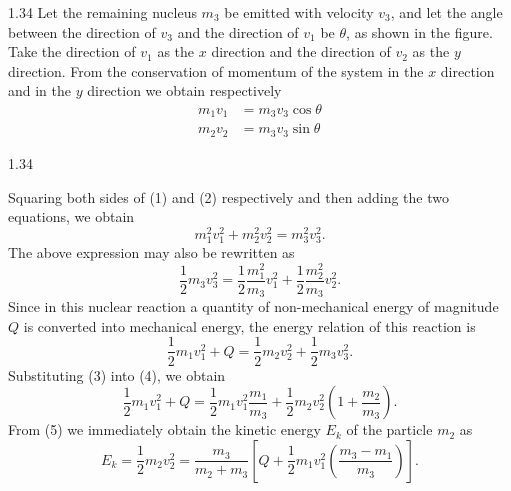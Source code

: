 \begin{solution}{1.34}
Let the remaining nucleus $m_3$ be emitted with velocity $v_3$, and let the angle between the direction of $v_3$ and the direction of $v_1$ be $\theta$, as shown in the figure. Take the direction of $v_1$ as the $x$ direction and the direction of $v_2$ as the $y$ direction. From the conservation of momentum of the system in the $x$ direction and in the $y$ direction we obtain respectively
\begin{align}
m_1v_1 &= m_3v_3\cos\theta \tag{1}\\
m_2v_2 &= m_3v_3\sin\theta \tag{2}
\end{align}

\begin{figbox}{1.34}
\end{figbox}

Squaring both sides of (1) and (2) respectively and then adding the two equations, we obtain
\[
m_1^2v_1^2+m_2^2v_2^2=m_3^2v_3^2.
\]
The above expression may also be rewritten as
\begin{equation}
\frac{1}{2}m_3v_3^2=\frac{1}{2}\frac{m_1^2}{m_3}v_1^2+\frac{1}{2}\frac{m_2^2}{m_3}v_2^2. \tag{3}
\end{equation}
Since in this nuclear reaction a quantity of non-mechanical energy of magnitude $Q$ is converted into mechanical energy, the energy relation of this reaction is
\begin{equation}
\frac{1}{2}m_1v_1^2+Q=\frac{1}{2}m_2v_2^2+\frac{1}{2}m_3v_3^2. \tag{4}
\end{equation}
Substituting (3) into (4), we obtain
\begin{equation}
\frac{1}{2}m_1v_1^2+Q=\frac{1}{2}m_1v_1^2\frac{m_1}{m_3}
+\frac{1}{2}m_2v_2^2\left(1+\frac{m_2}{m_3}\right). \tag{5}
\end{equation}
From (5) we immediately obtain the kinetic energy $E_k$ of the particle $m_2$ as
\[
E_k=\frac{1}{2}m_2v_2^2=\frac{m_3}{m_2+m_3}
\left[Q+\frac{1}{2}m_1v_1^2\left(\frac{m_3-m_1}{m_3}\right)\right].
\]

\end{solution}

